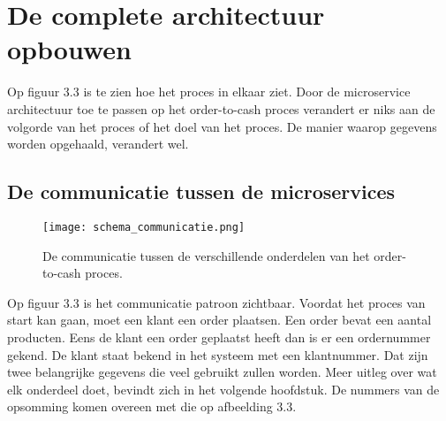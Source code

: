 \section{De complete architectuur opbouwen}
Op figuur 3.3 is te zien hoe het proces in elkaar ziet. Door de microservice architectuur toe te passen op het order-to-cash proces verandert er niks aan de volgorde van het proces of het doel van het proces. De manier waarop gegevens worden opgehaald, verandert wel. 

\subsection{De communicatie tussen de microservices}

\begin{figure}[h]
	\texttt{[image: schema\_communicatie.png]}
	\caption{De communicatie tussen de verschillende onderdelen van het order-to-cash proces.}
	\centering
\end{figure}
Op figuur 3.3 is het communicatie patroon zichtbaar.
Voordat het proces van start kan gaan, moet een klant een order plaatsen. Een order bevat een aantal producten. Eens de klant een order geplaatst heeft dan is er een ordernummer gekend. De klant staat bekend in het systeem met een klantnummer. Dat zijn twee belangrijke gegevens die veel gebruikt zullen worden.
Meer uitleg over wat elk onderdeel doet, bevindt zich in het volgende hoofdstuk.
De nummers van de opsomming komen overeen met die op afbeelding 3.3.
